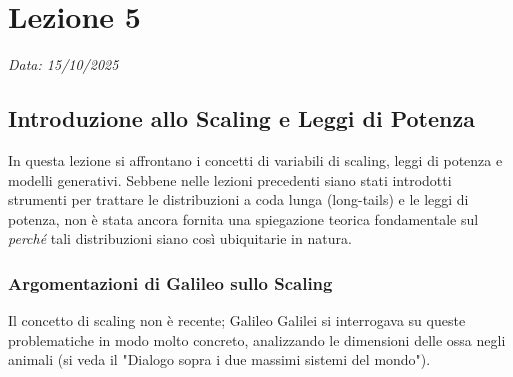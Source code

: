 \chapter{Lezione 5}
\label{chap:lezione_05} 

\begin{flushright}
\textit{Data: 15/10/2025}
\end{flushright}

\newcommand{\deriv}[2]{\frac{d #1}{d #2}}
\newcommand{\pderiv}[2]{\frac{\partial #1}{\partial #2}}


\section{Introduzione allo Scaling e Leggi di Potenza}

In questa lezione si affrontano i concetti di variabili di scaling, leggi di potenza e modelli generativi. Sebbene nelle lezioni precedenti siano stati introdotti strumenti per trattare le distribuzioni a coda lunga (long-tails) e le leggi di potenza, non è stata ancora fornita una spiegazione teorica fondamentale sul \textit{perché} tali distribuzioni siano così ubiquitarie in natura.

\subsection{Argomentazioni di Galileo sullo Scaling}
Il concetto di scaling non è recente; Galileo Galilei si interrogava su queste problematiche in modo molto concreto, analizzando le dimensioni delle ossa negli animali (si veda il "Dialogo sopra i due massimi sistemi del mondo").

